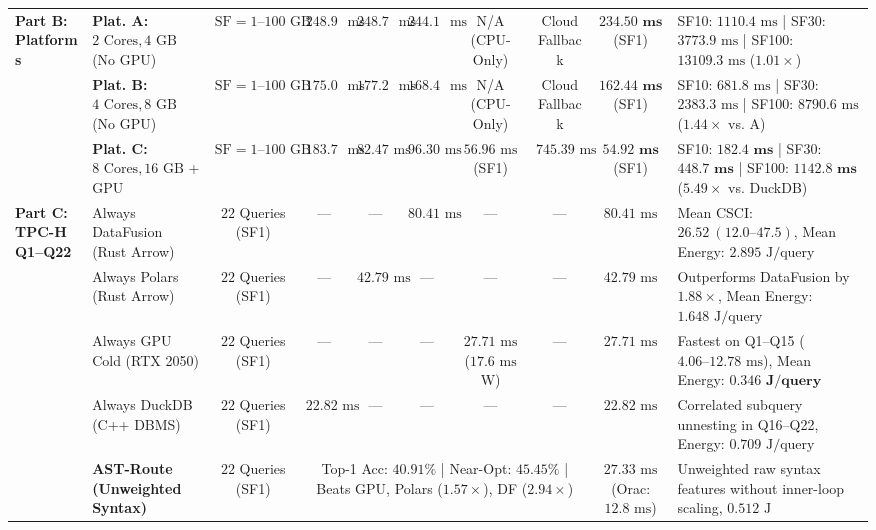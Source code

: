 \documentclass[10pt,a4paper]{article}
\newenvironment{fitasttable}{%
  \begin{lrbox}{\asttblbox}%
}{%
  \end{lrbox}%
  \sbox{\asttblboxB}{%
    \ifdim\wd\asttblbox>0.96\textwidth
      \resizebox{0.96\textwidth}{!}{\usebox{\asttblbox}}%
    \else
      \usebox{\asttblbox}%
    \fi
  }%
  \ifdim\ht\asttblboxB>0.72\textheight
    \resizebox{!}{0.72\textheight}{\usebox{\asttblboxB}}%
  \else
    \usebox{\asttblboxB}%
  \fi
}
\begin{document}
\begin{table}[!htbp]
\begin{fitasttable}
{\begin{tabular}{@{}llcccccccl@{}}
\midrule
\multirow{3}{*}{\textbf{Part B: Platforms}}
 & \textbf{Plat. A:} $2\text{ Cores}, 4\text{ GB}$ (No GPU) & $\text{SF}=1\text{--}100\text{ GB}$ & $248.99\text{ ms}$ & $248.74\text{ ms}$ & $244.12\text{ ms}$ & N/A (CPU-Only) & Cloud Fallback & $\mathbf{234.50\text{ ms}}$ (SF1) & SF10: $1110.4\text{ ms}$ | SF30: $3773.9\text{ ms}$ | SF100: $13109.3\text{ ms}$ ($1.01\times$) \\
 & \textbf{Plat. B:} $4\text{ Cores}, 8\text{ GB}$ (No GPU) & $\text{SF}=1\text{--}100\text{ GB}$ & $175.00\text{ ms}$ & $177.28\text{ ms}$ & $168.45\text{ ms}$ & N/A (CPU-Only) & Cloud Fallback & $\mathbf{162.44\text{ ms}}$ (SF1) & SF10: $681.8\text{ ms}$ | SF30: $2383.3\text{ ms}$ | SF100: $8790.6\text{ ms}$ ($\mathbf{1.44\times}$ vs. A) \\
 & \textbf{Plat. C:} $8\text{ Cores}, 16\text{ GB}$ + GPU & $\text{SF}=1\text{--}100\text{ GB}$ & $183.74\text{ ms}$ & $82.47\text{ ms}$ & $96.30\text{ ms}$ & $56.96\text{ ms}$ (SF1) & $745.39\text{ ms}$ & $\mathbf{54.92\text{ ms}}$ (SF1) & SF10: $\mathbf{182.4\text{ ms}}$ | SF30: $\mathbf{448.7\text{ ms}}$ | SF100: $\mathbf{1142.8\text{ ms}}$ ($\mathbf{5.49\times}$ vs. DuckDB) \\
\midrule
\multirow{6}{*}{\textbf{Part C: TPC-H Q1--Q22}}
 & Always DataFusion (Rust Arrow) & $22$ Queries (SF1) & --- & --- & $80.41\text{ ms}$ & --- & --- & $80.41\text{ ms}$ & Mean CSCI: $26.52\ (12.0\text{--}47.5)$, Mean Energy: $2.895\text{ J/query}$ \\
 & Always Polars (Rust Arrow) & $22$ Queries (SF1) & --- & $42.79\text{ ms}$ & --- & --- & --- & $42.79\text{ ms}$ & Outperforms DataFusion by $1.88\times$, Mean Energy: $1.648\text{ J/query}$ \\
 & Always GPU Cold (RTX 2050) & $22$ Queries (SF1) & --- & --- & --- & $27.71\text{ ms}$ ($17.6\text{ ms}$ W) & --- & $27.71\text{ ms}$ & Fastest on Q1--Q15 ($4.06\text{--}12.78\text{ ms}$), Mean Energy: $\mathbf{0.346\text{ J/query}}$ \\
 & Always DuckDB (C++ DBMS) & $22$ Queries (SF1) & $22.82\text{ ms}$ & --- & --- & --- & --- & $22.82\text{ ms}$ & Correlated subquery unnesting in Q16--Q22, Energy: $0.709\text{ J/query}$ \\
 & \textbf{AST-Route (Unweighted Syntax)} & $22$ Queries (SF1) & \multicolumn{5}{c}{Top-1 Acc: $40.91\%$ | Near-Opt: $45.45\%$ | Beats GPU, Polars ($1.57\times$), DF ($2.94\times$)} & $27.33\text{ ms}$ (Orac: $12.8\text{ ms}$) & Unweighted raw syntax features without inner-loop scaling, $0.512\text{ J}$ \\

\end{tabular}}
\end{fitasttable}
\end{table}
\end{document}
